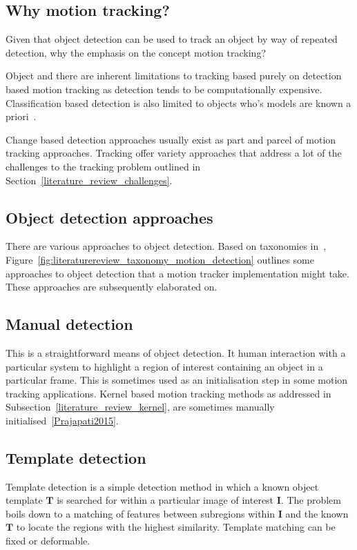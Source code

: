 \subsection{Why motion tracking?}
Given that object detection can be used to track an object by way of repeated
detection, why the emphasis on the concept motion tracking?

Object and there are inherent limitations to tracking based purely on
detection based motion tracking as detection tends to be computationally
expensive. Classification based detection is also limited to objects who's
models are known a priori~\cite{Forsyth2012}.

Change based detection approaches usually exist as part and parcel of motion
tracking approaches. Tracking offer variety approaches that address a lot of the
challenges to the tracking problem outlined in
Section~\ref{literature_review_challenges}.

\subsection{Object detection approaches}
There are various approaches to object detection. Based on taxonomies
in~\cite{Prajapati2015,Shantaiya2013}, 
Figure~\ref{fig:literaturereview_taxonomy_motion_detection} outlines some
approaches to object detection that a motion tracker implementation might take.
These approaches are subsequently elaborated on.


\subsection{Manual detection}
This is a straightforward means of object detection. It human interaction with a
particular system to highlight a region of interest containing an object in
a particular frame. This is sometimes used as an initialisation step in some
motion tracking applications. Kernel based motion tracking methods as addressed
in Subsection~\ref{literature_review_kernel}, are sometimes manually
initialised~\ref{Prajapati2015}.

\subsection{Template detection}
Template detection is a simple detection method in which a known object
template $\mathbf{T}$ is searched for within a particular image of interest
$\mathbf{I}$. The problem boils down to a matching of features between
subregions within $\mathbf{I}$ and the known $\mathbf{T}$ to locate the regions
with the highest similarity. Template matching can be fixed or deformable. 

